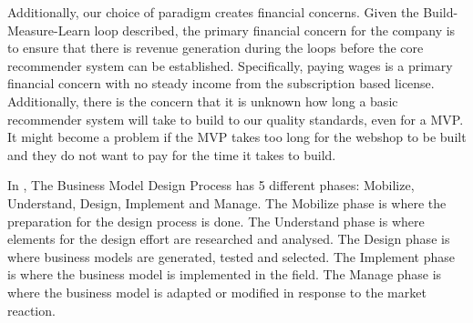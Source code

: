 Additionally, our choice of paradigm creates financial concerns. 
Given the Build-Measure-Learn loop described, the primary financial concern for the company is to ensure that there is revenue generation during the loops before the core recommender system can be established. 
Specifically, paying wages is a primary financial concern with no steady income from the subscription based license. 
Additionally, there is the concern that it is unknown how long a basic recommender system will take to build to our quality standards, even for a MVP.
It might become a problem if the MVP takes too long for the webshop to be built and they do not want to pay for the time it takes to build.

In \citet[pg. 241-261]{osterwalder}, The Business Model Design Process has 5 different phases: Mobilize, Understand, Design, Implement and Manage.
The Mobilize phase is where the preparation for the design process is done.
The Understand phase is where elements for the design effort are researched and analysed. 
The Design phase is where business models are generated, tested and selected. 
The Implement phase is where the business model is implemented in the field. 
The Manage phase is where the business model is adapted or modified in response to the market reaction.

%
